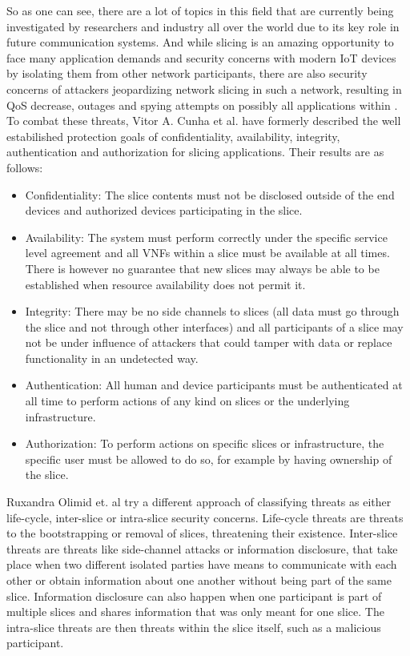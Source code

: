 \documentclass{article}
\begin{document}
So as one can see, there are a lot of topics in this field that are currently being investigated by researchers and industry all over the world due to its key role in future communication systems.  And while slicing is an amazing opportunity to face many application demands and security concerns with modern IoT devices by isolating them from other network participants, there are also security concerns of attackers jeopardizing network slicing in such a network, resulting in QoS decrease, outages and spying attempts on possibly all applications within \cite{SE1}. To combat these threats, Vitor A. Cunha et al. \cite{SE1} have formerly described the well estabilished protection goals of confidentiality, availability, integrity, authentication and authorization for slicing applications. Their results are as follows:
\begin{itemize}
    \item Confidentiality: The slice contents must not be disclosed outside of the end devices and authorized devices participating in the slice.
    \item Availability: The system must perform correctly under the specific service level agreement and all VNFs within a slice must be available at all times. There is however no guarantee that new slices may always be able to be established when resource availability does not permit it.
    \item Integrity: There may be no side channels to slices (all data must go through the slice and not through other interfaces) and all participants of a slice may not be under influence of attackers that could tamper with data or replace functionality in an undetected way.
    \item Authentication: All human and device participants must be authenticated at all time to perform actions of any kind on slices or the underlying infrastructure.
    \item Authorization: To perform actions on specific slices or infrastructure, the specific user must be allowed to do so, for example by having ownership of the slice.
\end{itemize}
Ruxandra Olimid et. al \cite{SE2} try a different approach of classifying threats as either life-cycle, inter-slice or intra-slice security concerns. Life-cycle threats are threats to the bootstrapping or removal of slices, threatening their existence. Inter-slice threats are threats like side-channel attacks or information disclosure, that take place when two different isolated parties have means to communicate with each other or obtain information about one another without being part of the same slice. Information disclosure can also happen when one participant is part of multiple slices and shares information that was only meant for one slice. The intra-slice threats are then threats within the slice itself, such as a malicious participant.
\end{document}
